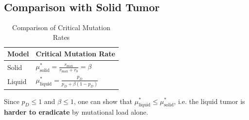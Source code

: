 \documentclass[11pt,a4paper]{article}
\begin{document}
\subsection{Comparison with Solid Tumor}

\begin{table}[h!]
\centering
\caption{Comparison of Critical Mutation Rates}
\begin{tabular}{ll}
\toprule
\textbf{Model} & \textbf{Critical Mutation Rate} \\
\midrule
Solid & $\mu^*_{\text{solid}} = \frac{r_{\max}}{r_{\max} + r_0} = \beta$ \\
Liquid & $\mu^*_{\text{liquid}} = \frac{p_D}{p_D + \beta(1-p_D)}$ \\
\bottomrule
\end{tabular}
\end{table}

Since $p_D \leq 1$ and $\beta \leq 1$, one can show that $\mu^*_{\text{liquid}} \leq \mu^*_{\text{solid}}$,
i.e. the liquid tumor is \textbf{harder to eradicate} by mutational load alone.
\end{document}
